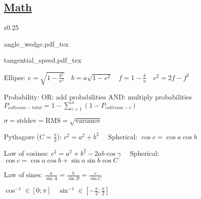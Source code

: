\documentclass[11pt,landscape]{article}
\begin{document}
\linespread{2}
\raggedright
\footnotesize

\setlength{\premulticols}{1pt}
\setlength{\postmulticols}{1pt}
\setlength{\multicolsep}{1pt}
\setlength{\columnsep}{2pt}



\newcommand{\norm}[1]{\left\lVert #1 \right\rVert}

\makeatletter
\newcommand*\dotp{\mathpalette\dotp@{.5}}
\newcommand*\dotp@[2]{\mathbin{\vcenter{\hbox{\scalebox{#2}{$\m@th#1\bullet$}}}}}
\makeatother


\newpage
\subsection{\underline{Math}}

\begin{wrapfigure}{r}{0.25\textwidth}

\quad

{angle_wedge.pdf_tex}

\quad

{tangential_speed.pdf_tex}
\end{wrapfigure}

Ellipse:
$
e = \sqrt{1-\frac{b^2}{a^2}}
\quad
b = a\sqrt{1-e^2}
\quad
f = 1 - \frac{b}{a}
\quad
e^2 = 2f - f^2
$

Probability: 
OR: add probabilities
AND: multiply probabilities
$P_{collision-total} = 1 - \sum_{i=1}^{n}(1-P_{collision-i})$

$
\sigma
= \text{stddev}
= \text{RMS}
= \sqrt{\text{variance}}
$

Pythagore ($C=\frac{\pi}{2}$):
$c^2 = a^2 + b^2
\quad$
Spherical:
$\cos{c} = \cos{a}\cos{b}$

Law of cosines:
$
c^2 = a^2 + b^2 - 2ab\cos{\gamma}
\quad
$
Spherical:
$
\cos{c} = \cos{a}\cos{b} + \sin{a}\sin{b}\cos{C}
$

Law of sines:
$
\frac{a}{\sin{A}} =
\frac{b}{\sin{B}} =
\frac{c}{\sin{C}}
$

$
\cos^{-1} \in [0; \pi]
\quad
\sin^{-1} \in [-\frac{\pi}{2}; \frac{\pi}{2}]
$
\end{document}
